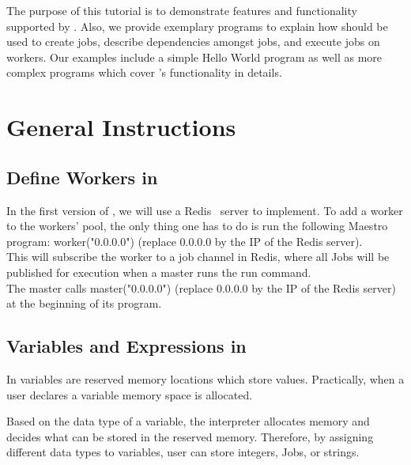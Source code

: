
The purpose of this tutorial is to demonstrate features and functionality 
supported by \lang{}. Also, we provide exemplary programs  to
explain how \lang{}  should be used to create jobs, describe dependencies amongst jobs,
and execute jobs on workers. Our examples include a simple Hello World program as well as
more complex programs which cover \lang{}'s functionality in details.


\section{General Instructions}
\label{sect:general}

\subsection*{Define Workers in \lang{}}
In the first version of \lang{}, we will use a Redis~\cite{redis} server to
implement. To add a worker to the workers' pool, the only thing one has to do
is run the following Maestro program: worker("0.0.0.0") (replace 0.0.0.0 by
the IP of the Redis server).\\
This will subscribe the worker to a job channel in Redis, where all Jobs will
be published for execution when a master runs the run command.\\
The master calls master("0.0.0.0") (replace 0.0.0.0 by the IP of the Redis server)
at the beginning of its program.

\subsection*{Variables and Expressions in \lang{}}
In \lang{} variables are reserved memory locations which store values.
Practically, when a user declares a variable memory space is allocated.

Based on the data type of a variable, the interpreter allocates memory
and decides what can be stored in the reserved memory. Therefore, by
assigning different data types to variables, user can store integers, Jobs,
or strings.

